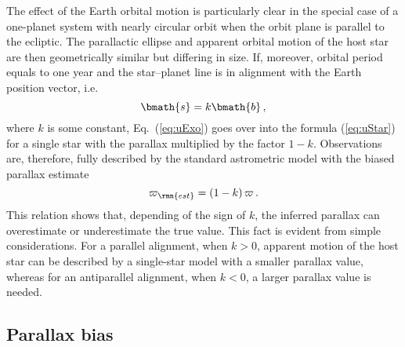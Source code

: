 \documentclass[fleqn,usenatbib,useAMS,usedcolumn]{mnras}
\begin{document}
The effect of the Earth orbital motion is particularly clear in the special case of a one-planet system with nearly circular orbit when the orbit plane is parallel to the ecliptic. The parallactic ellipse and apparent orbital motion of the host star are then geometrically similar but differing in size. If, moreover, orbital period equals to one year and the star--planet line is in alignment with the Earth position vector, i.e.
\begin{equation}\label{eq:kappa}
 \bmath{s}=k\bmath{b}\,,
\end{equation}
where $k$ is some constant, Eq.~(\ref{eq:uExo}) goes over into the formula (\ref{eq:uStar}) for a single star with the parallax multiplied by the factor $1-k$. Observations are, therefore, fully described by the standard astrometric model with the biased parallax estimate
\begin{equation}
  \varpi_\rmn{est}=\left(1-k\right)\varpi\,.
\end{equation}
This relation shows that, depending of the sign of $k$, the inferred parallax can overestimate or underestimate the true value. This fact is evident from simple considerations. For a parallel alignment, when $k>0$, apparent motion of the host star can be described by a single-star model with a smaller parallax value, whereas for an antiparallel alignment, when $k<0$, a larger parallax value is needed.

\subsection{Parallax bias}
\label{ss:bias}
\end{document}
